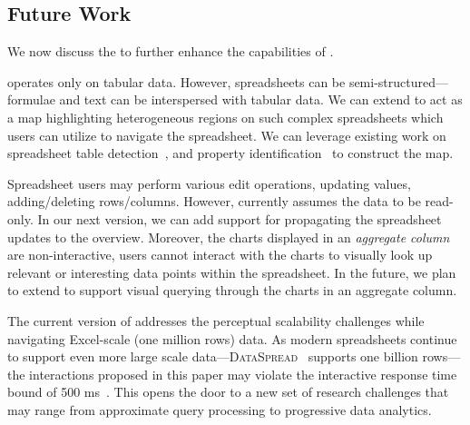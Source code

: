  

\subsection{Future Work}
We now discuss the to further enhance the capabilities of \noah. 

 \noah operates only on tabular data. 
However, spreadsheets can be semi-structured---formulae 
and text can be interspersed with tabular data. 
We can extend \noah to act as a map highlighting heterogeneous regions on such complex spreadsheets which users can utilize to navigate the spreadsheet. 
We can leverage existing work on spreadsheet table detection~\cite{tablesense}, 
and property identification~\cite{chen2017spreadsheet} 
to construct the map.  

 
Spreadsheet users may perform various edit operations, 
\eg updating values, adding/deleting rows/columns. 
However, \noah currently assumes the data to be read-only. 
In our next version, we can add support for 
propagating the spreadsheet updates to the overview. 
Moreover, the charts displayed in an \emph{aggregate column} are non-interactive, 
\ie users cannot interact with the charts to visually look up relevant or 
interesting data points within the spreadsheet. 
In the future, we plan to extend \noah to support visual querying 
through the charts in an aggregate column.

The current version of \noah addresses the perceptual 
scalability challenges while navigating 
Excel-scale (one million rows) data. 
As modern spreadsheets continue to support 
even more large scale data---{\scshape DataSpread}~\cite{datamodels} 
supports one billion rows---the interactions proposed in this paper may violate the interactive response time bound of 500 ms~\cite{liu2014effects}. This opens the door to a new set of research challenges that may range from approximate query processing to progressive data analytics.

